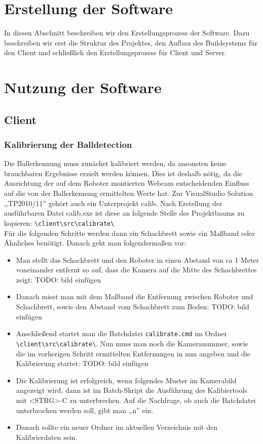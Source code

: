 
\chapter{Erstellung der Software}
\label{cha:erstellung}
In diesen Abschnitt beschreiben wir den Erstellungsprozess der
Software. Dazu beschreiben wir erst die Struktur des Projektes, den
Aufbau des Buildsystems für den Client und schließlich den Erstellungsprozess für
Client und Server.




\chapter{Nutzung der Software}
\label{cha:nutzung}
\section{Client}
\label{sec:client-1}

\subsection{Kalibrierung der Balldetection}
\label{sec:kalibr-der-balld}
Die Ballerkennung muss zunächst kalibriert werden, da ansonsten keine
brauchbaren Ergebnisse erzielt werden können. Dies ist deshalb nötig,
da die Ausrichtung der auf dem Roboter montierten Webcam
entscheidenden Einfluss auf die von der Ballerkennung ermittelten
Werte hat. Zur VisualStudio Solution ,,TP2010/11'' gehört auch ein
Unterprojekt calib. Nach Erstellung der ausführbaren Datei calib.exe
ist diese an folgende Stelle des Projektbaums zu kopieren:
\verb|\client\src\calibrate\| \\ 
Für die folgenden Schritte werden dann ein Schachbrett sowie ein
Maßband oder Ähnliches benötigt. 
Danach geht man folgendermaßen vor:
\begin{itemize}
\item Man stellt das Schachbrett und den Roboter in einen Abstand von
  ca 1 Meter voneinander entfernt so auf, dass die Kamera auf die
  Mitte des Schachbrettes zeigt:
 TODO: bild einfügen
\item Danach misst man mit dem Maßband die Entfernung zwischen Roboter
  und Schachbrett, sowie den Abstand vom Schachbrett zum Boden:
TODO: bild einfügen
\item Anschließend startet man die Batchdatei \verb|calibrate.cmd| im
  Ordner \verb|\client\src\calibrate\|. Nun muss man noch die
  Kameranummer, sowie die im vorherigen Schritt ermittelten
  Entfernungen in mm angeben und die Kalibrierung startet:
TODO: bild einfügen
\item Die Kalibrierung ist erfolgreich, wenn folgendes Muster im
  Kamerabild angezeigt wird, dann ist im Batch-Skript die Ausführung
  des Kalibiertools mit <STRG>-C zu unterbrechen. Auf die Nachfrage,
  ob auch die Batchdatei unterbrochen werden soll, gibt man ,,n'' ein.
\item Danach sollte ein neuer Ordner im aktuellen Verzeichnis mit den
  Kalibrierdaten sein.
\end{itemize}

